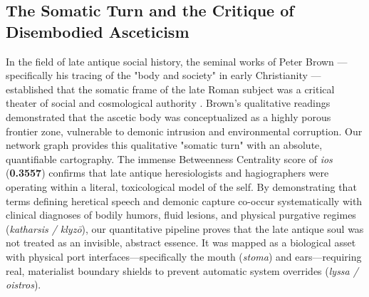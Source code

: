 \documentclass[11pt,twoside,a4paper]{article}
\begin{document}
\subsection{The Somatic Turn and the Critique of Disembodied Asceticism}
In the field of late antique social history, the seminal works of Peter Brown — specifically his tracing of the "body and society" in early Christianity \cite{brown1988body} — established that the somatic frame of the late Roman subject was a critical theater of social and cosmological authority \cite{brown1988body}. Brown's qualitative readings demonstrated that the ascetic body was conceptualized as a highly porous frontier zone, vulnerable to demonic intrusion and environmental corruption.
Our network graph provides this qualitative "somatic turn" with an absolute, quantifiable cartography. The immense Betweenness Centrality score of \textit{ios} (\textbf{0.3557}) confirms that late antique heresiologists and hagiographers were operating within a literal, toxicological model of the self. By demonstrating that terms defining heretical speech and demonic capture co-occur systematically with clinical diagnoses of bodily humors, fluid lesions, and physical purgative regimes (\textit{katharsis / klyzō}), our quantitative pipeline proves that the late antique soul was not treated as an invisible, abstract essence. It was mapped as a biological asset with physical port interfaces—specifically the mouth (\textit{stoma}) and ears—requiring real, materialist boundary shields to prevent automatic system overrides (\textit{lyssa / oistros}).
\end{document}
